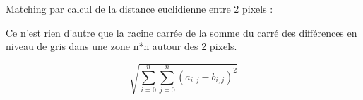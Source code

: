 Matching par calcul de la distance euclidienne entre 2 pixels :

Ce n'est rien d'autre que la racine carrée de la somme du carré des différences en niveau de gris dans une zone n*n autour des 2 pixels.

$$ \sqrt{\sum_{i=0}^{n}\sum_{j=0}^{n}(a_{i,j} - b_{i,j})^2} $$